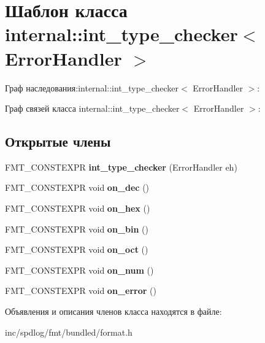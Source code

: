 \hypertarget{classinternal_1_1int__type__checker}{}\section{Шаблон класса internal\+:\+:int\+\_\+type\+\_\+checker$<$ Error\+Handler $>$}
\label{classinternal_1_1int__type__checker}


Граф наследования\+:internal\+:\+:int\+\_\+type\+\_\+checker$<$ Error\+Handler $>$\+:


Граф связей класса internal\+:\+:int\+\_\+type\+\_\+checker$<$ Error\+Handler $>$\+:
\subsection*{Открытые члены}
\begin{DoxyCompactItemize}
\item 
\mbox{\label{classinternal_1_1int__type__checker_ab2aeccba63ca09791645ff5b28512c57}} 
F\+M\+T\+\_\+\+C\+O\+N\+S\+T\+E\+X\+PR {\bfseries int\+\_\+type\+\_\+checker} (Error\+Handler eh)
\item 
\mbox{\label{classinternal_1_1int__type__checker_ad5b0a2534b245ce2c5065fb26a1ca862}} 
F\+M\+T\+\_\+\+C\+O\+N\+S\+T\+E\+X\+PR void {\bfseries on\+\_\+dec} ()
\item 
\mbox{\label{classinternal_1_1int__type__checker_ac20c7c499f7a4f0cdab9d3c0422fe1d0}} 
F\+M\+T\+\_\+\+C\+O\+N\+S\+T\+E\+X\+PR void {\bfseries on\+\_\+hex} ()
\item 
\mbox{\label{classinternal_1_1int__type__checker_ad4e6f52b4f8cf156223d24c19b1928fc}} 
F\+M\+T\+\_\+\+C\+O\+N\+S\+T\+E\+X\+PR void {\bfseries on\+\_\+bin} ()
\item 
\mbox{\label{classinternal_1_1int__type__checker_ac67ad988c660e553e4b09232c6450e3d}} 
F\+M\+T\+\_\+\+C\+O\+N\+S\+T\+E\+X\+PR void {\bfseries on\+\_\+oct} ()
\item 
\mbox{\label{classinternal_1_1int__type__checker_a909fd19b4b6f6a60050328e53b27305c}} 
F\+M\+T\+\_\+\+C\+O\+N\+S\+T\+E\+X\+PR void {\bfseries on\+\_\+num} ()
\item 
\mbox{\label{classinternal_1_1int__type__checker_a9da79c30a3dbabe952392ccdd9a45acb}} 
F\+M\+T\+\_\+\+C\+O\+N\+S\+T\+E\+X\+PR void {\bfseries on\+\_\+error} ()
\end{DoxyCompactItemize}


Объявления и описания членов класса находятся в файле\+:\begin{DoxyCompactItemize}
\item 
inc/spdlog/fmt/bundled/format.\+h\end{DoxyCompactItemize}
